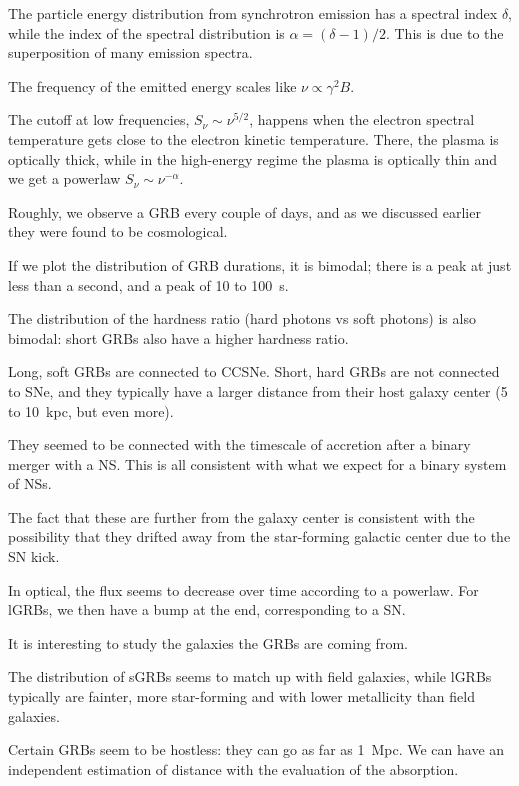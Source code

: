 \documentclass[main.tex]{subfiles}
\begin{document}

The particle energy distribution from synchrotron emission has a spectral index \(\delta \), 
while the index of the spectral distribution is \(\alpha = ( \delta - 1 ) / 2\). 
This is due to the superposition of many emission spectra. 

The frequency of the emitted energy scales like \(\nu \propto \gamma^2 B\). 

The cutoff at low frequencies, \(S_\nu \sim \nu^{5/2}\), happens when the electron 
spectral temperature gets close to the electron kinetic temperature. 
There, the plasma is optically thick, while
in the high-energy regime the plasma is optically thin and we get 
a powerlaw \(S_\nu \sim \nu^{-\alpha }\). 

Roughly, we observe a GRB every couple of days, and as we discussed earlier 
they were found to be cosmological. 

If we plot the distribution of GRB durations, it is bimodal;
there is a peak at just less than a second, and a peak of 10 to \SI{100}{s}. 

The distribution of the hardness ratio (hard photons vs soft photons)
is also bimodal: short GRBs also have a higher hardness ratio. 

Long, soft GRBs are connected to CCSNe. 
Short, hard GRBs are not connected to SNe, and they typically have a larger 
distance from their host galaxy center (5 to \SI{10}{kpc}, but even more). 


They seemed to be connected with the timescale of accretion after a binary merger with a NS. 
This is all consistent with what we expect for a binary system of NSs.

The fact that these are further from the galaxy center is consistent with 
the possibility that they drifted away from the star-forming 
galactic center due to the SN kick. 

In optical, the flux seems to decrease over time according to a powerlaw. 
For lGRBs, we then have a bump at the end, corresponding to a SN. 

It is interesting to study the galaxies the GRBs are coming from. 

The distribution of sGRBs seems to match up with field galaxies, 
while lGRBs typically are fainter, more star-forming and with lower metallicity
than field galaxies. 

Certain GRBs seem to be hostless: they can go as far as \SI{1}{Mpc}. 
We can have an independent estimation of distance with the evaluation
of the absorption. 
\end{document}
